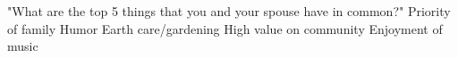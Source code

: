 "What are the top 5 things that you and your spouse have in common?"
Priority of family
Humor
Earth care/gardening
High value on community
Enjoyment of music





